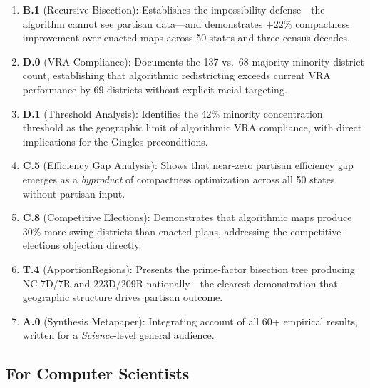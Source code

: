 \documentclass[12pt]{article}
\begin{document}
\begin{enumerate}[leftmargin=*,noitemsep,topsep=2pt]
    \item \textbf{B.1} (Recursive Bisection): Establishes the impossibility
        defense---the algorithm cannot see partisan data---and demonstrates
        $+22\%$ compactness improvement over enacted maps across 50 states
        and three census decades.

    \item \textbf{D.0} (VRA Compliance): Documents the 137 vs.\ 68
        majority-minority district count, establishing that algorithmic
        redistricting exceeds current VRA performance by 69 districts without
        explicit racial targeting.

    \item \textbf{D.1} (Threshold Analysis): Identifies the 42\% minority
        concentration threshold as the geographic limit of algorithmic VRA
        compliance, with direct implications for the Gingles preconditions.

    \item \textbf{C.5} (Efficiency Gap Analysis): Shows that near-zero
        partisan efficiency gap emerges as a \emph{byproduct} of compactness
        optimization across all 50 states, without partisan input.

    \item \textbf{C.8} (Competitive Elections): Demonstrates that algorithmic
        maps produce 30\% more swing districts than enacted plans, addressing
        the competitive-elections objection directly.

    \item \textbf{T.4} (ApportionRegions): Presents the prime-factor
        bisection tree producing NC 7D/7R and 223D/209R nationally---the
        clearest demonstration that geographic structure drives partisan
        outcome.

    \item \textbf{A.0} (Synthesis Metapaper): Integrating account of all 60+
        empirical results, written for a \emph{Science}-level general audience.
\end{enumerate}

\subsection{For Computer Scientists}
\end{document}
